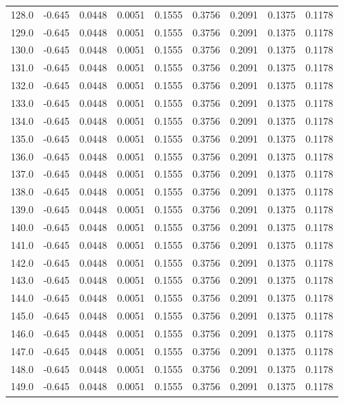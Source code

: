 \begin{longtable}{lrrrrrrrr}
128.0 & -0.645 & 0.0448 & 0.0051 & 0.1555 & 0.3756 & 0.2091 & 0.1375 & 0.1178 \\
129.0 & -0.645 & 0.0448 & 0.0051 & 0.1555 & 0.3756 & 0.2091 & 0.1375 & 0.1178 \\
130.0 & -0.645 & 0.0448 & 0.0051 & 0.1555 & 0.3756 & 0.2091 & 0.1375 & 0.1178 \\
131.0 & -0.645 & 0.0448 & 0.0051 & 0.1555 & 0.3756 & 0.2091 & 0.1375 & 0.1178 \\
132.0 & -0.645 & 0.0448 & 0.0051 & 0.1555 & 0.3756 & 0.2091 & 0.1375 & 0.1178 \\
133.0 & -0.645 & 0.0448 & 0.0051 & 0.1555 & 0.3756 & 0.2091 & 0.1375 & 0.1178 \\
134.0 & -0.645 & 0.0448 & 0.0051 & 0.1555 & 0.3756 & 0.2091 & 0.1375 & 0.1178 \\
135.0 & -0.645 & 0.0448 & 0.0051 & 0.1555 & 0.3756 & 0.2091 & 0.1375 & 0.1178 \\
136.0 & -0.645 & 0.0448 & 0.0051 & 0.1555 & 0.3756 & 0.2091 & 0.1375 & 0.1178 \\
137.0 & -0.645 & 0.0448 & 0.0051 & 0.1555 & 0.3756 & 0.2091 & 0.1375 & 0.1178 \\
138.0 & -0.645 & 0.0448 & 0.0051 & 0.1555 & 0.3756 & 0.2091 & 0.1375 & 0.1178 \\
139.0 & -0.645 & 0.0448 & 0.0051 & 0.1555 & 0.3756 & 0.2091 & 0.1375 & 0.1178 \\
140.0 & -0.645 & 0.0448 & 0.0051 & 0.1555 & 0.3756 & 0.2091 & 0.1375 & 0.1178 \\
141.0 & -0.645 & 0.0448 & 0.0051 & 0.1555 & 0.3756 & 0.2091 & 0.1375 & 0.1178 \\
142.0 & -0.645 & 0.0448 & 0.0051 & 0.1555 & 0.3756 & 0.2091 & 0.1375 & 0.1178 \\
143.0 & -0.645 & 0.0448 & 0.0051 & 0.1555 & 0.3756 & 0.2091 & 0.1375 & 0.1178 \\
144.0 & -0.645 & 0.0448 & 0.0051 & 0.1555 & 0.3756 & 0.2091 & 0.1375 & 0.1178 \\
145.0 & -0.645 & 0.0448 & 0.0051 & 0.1555 & 0.3756 & 0.2091 & 0.1375 & 0.1178 \\
146.0 & -0.645 & 0.0448 & 0.0051 & 0.1555 & 0.3756 & 0.2091 & 0.1375 & 0.1178 \\
147.0 & -0.645 & 0.0448 & 0.0051 & 0.1555 & 0.3756 & 0.2091 & 0.1375 & 0.1178 \\
148.0 & -0.645 & 0.0448 & 0.0051 & 0.1555 & 0.3756 & 0.2091 & 0.1375 & 0.1178 \\
149.0 & -0.645 & 0.0448 & 0.0051 & 0.1555 & 0.3756 & 0.2091 & 0.1375 & 0.1178 \\

\end{longtable}
